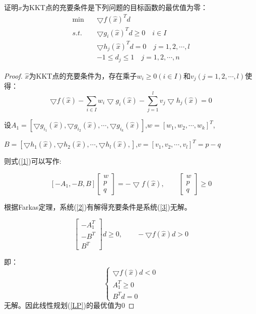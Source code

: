 \documentclass[a4paper,12pt]{article}
\begin{document}
证明$\hat{x}$为KKT点的充要条件是下列问题的目标函数的最优值为零：
\begin{equation}
\label{LP}
\begin{aligned}
\min \quad& \bigtriangledown f(\hat{x})^Td\\
s.t. \quad& \bigtriangledown g_i(\hat{x})^Td\ge 0\quad i\in I \\
& \bigtriangledown h_j(\hat{x})^Td=0\quad j=1,2,\cdots,l \\
& -1\le d_j\le 1\quad j=1,2,\cdots,n
\end{aligned}
\end{equation}

\begin{proof}
	$\hat{x}$为KKT点的充要条件为，存在乘子$w_i\ge 0(i\in I)$和$v_j(j=1,2,\cdots,l)$使得：
	\begin{equation}
	\label{1}
	\bigtriangledown f(\hat{x})-\sum_{i\in I}w_i\bigtriangledown g_i(\hat{x})-\sum_{j=1}^{l}v_j\bigtriangledown h_j(\hat{x})=0
	\end{equation}
	
	设$A_1=[\bigtriangledown g_{i_1}(\hat{x}),\bigtriangledown g_{i_2}(\hat{x}),\cdots,\bigtriangledown g_{i_k}(\hat{x})]$,$w=[w_1,w_2,\cdots,w_k]^T$,
	
	$B=[\bigtriangledown h_1(\hat{x}),\bigtriangledown h_2(\hat{x}),\cdots,\bigtriangledown h_l(\hat{x}),]$,$v=[v_1,v_2,\cdots,v_l]^T=p-q$
	
	则式(\ref{1})可以写作:
	
	\begin{equation}
	\label{2}
	\left[-A_1,-B,B\right]\left[
	\begin{array}{c}
	w\\p\\q
	\end{array}\right]=-\bigtriangledown f(\hat{x}),\qquad
	\left[
	\begin{array}{c}
	w\\p\\q
	\end{array}\right]\ge 0
	\end{equation}
	
	根据Farkas定理，系统(\ref{2})有解得充要条件是系统(\ref{3})无解。
	
	\begin{equation}
	\label{3}
	\left[
	\begin{array}{c}
	-A_1^T\\-B^T\\B^T
	\end{array}
	\right]d\ge 0,\qquad -\bigtriangledown f(\hat{x})d>0
	\end{equation}
	
	即：
	\begin{equation}
	\left\{
	\begin{array}{c}
	\bigtriangledown f(\hat{x})d<0 \\
	A_1^T\ge 0 \\
	B^Td=0
	\end{array}
	\right.
	\end{equation}
	无解。因此线性规划(\ref{LP})的最优值为0
\end{proof}
\end{document}

